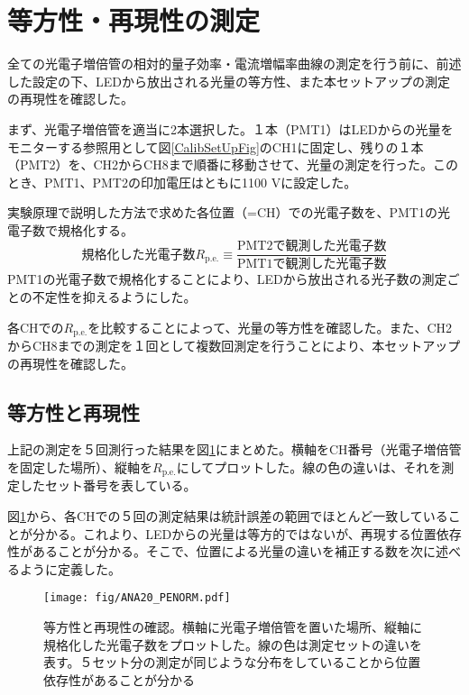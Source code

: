 \documentclass[11pt]{jreport}
\newcommand{\figref}[1]{図\ref{#1}}
\newcommand{\pe}{\mathrm{p.e.}}
\begin{document}
\section{等方性・再現性の測定}
全ての光電子増倍管の相対的量子効率・電流増幅率曲線の測定を行う前に、前述した設定の下、LEDから放出される光量の等方性、また本セットアップの測定の再現性を確認した。

まず、光電子増倍管を適当に2本選択した。１本（PMT1）はLEDからの光量をモニターする参照用として\figref{CalibSetUpFig}のCH1に固定し、残りの１本（PMT2）を、CH2からCH8まで順番に移動させて、光量の測定を行った。このとき、PMT1、PMT2の印加電圧はともに1100 Vに設定した。

実験原理で説明した方法で求めた各位置（=CH）での光電子数を、PMT1の光電子数で規格化する。
\begin{equation}
\text{規格化した光電子数}R_{\pe} \equiv \frac{\text{PMT2で観測した光電子数}}{\text{PMT1で観測した光電子数}}
\end{equation}
PMT1の光電子数で規格化することにより、LEDから放出される光子数の測定ごとの不定性を抑えるようにした。

各CHでの$R_{\pe}$を比較することによって、光量の等方性を確認した。また、CH2からCH8までの測定を１回として複数回測定を行うことにより、本セットアップの再現性を確認した。



\subsection{等方性と再現性}
上記の測定を５回測行った結果を\figref{CalibIsoRepCheck}にまとめた。横軸をCH番号（光電子増倍管を固定した場所）、縦軸を$R_{\pe}$にしてプロットした。線の色の違いは、それを測定したセット番号を表している。

\figref{CalibIsoRepCheck}から、各CHでの５回の測定結果は統計誤差の範囲でほとんど一致していることが分かる。これより、LEDからの光量は等方的ではないが、再現する位置依存性があることが分かる。そこで、位置による光量の違いを補正する数を次に述べるように定義した。

\begin{figure}[htbp]
\begin{center}
\texttt{[image: fig/ANA20\_PENORM.pdf]}
\caption[等方性と再現性の確認]{等方性と再現性の確認。横軸に光電子増倍管を置いた場所、縦軸に規格化した光電子数をプロットした。線の色は測定セットの違いを表す。５セット分の測定が同じような分布をしていることから位置依存性があることが分かる}
\label{CalibIsoRepCheck}
\end{center}
\end{figure}
\end{document}
